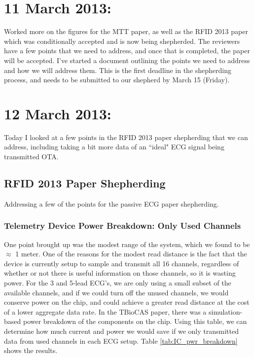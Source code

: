 \documentclass[12pt,onecolumn,titlepage]{article}
\begin{document}
\clearpage
\section{11 March 2013:}

\indent \indent Worked more on the figures for the MTT paper, as well as the RFID 2013 paper which was conditionally accepted and is now being shepherded. The reviewers have a few points that we need to address, and once that is completed, the paper will be accepted. I've started a document outlining the points we need to address and how we will address them. This is the first deadline in the shepherding process, and needs to be submitted to our shepherd by March 15 (Friday). 



\clearpage
\section{12 March 2013:}

\indent \indent Today I looked at a few points in the RFID 2013 paper shepherding that we can address, including taking a bit more data of an ``ideal" ECG signal being transmitted OTA.

\subsection{RFID 2013 Paper Shepherding}
\indent \indent Addressing a few of the points for the passive ECG paper shepherding.

\subsubsection{Telemetry Device Power Breakdown: Only Used Channels}
\indent \indent One point brought up was the modest range of the system, which we found to be $\approx$ 1 meter. One of the reasons for the modest read distance is the fact that the device is currently setup to sample and transmit all 16 channels, regardless of whether or not there is useful information on those channels, so it is wasting power. For the 3 and 5-lead ECG's, we are only using a small subset of the available channels, and if we could turn off the unused channels, we would conserve power on the chip, and could achieve a greater read distance at the cost of a lower aggregate data rate. In the TBioCAS paper, there was a simulation-based power breakdown of the components on the chip. Using this table, we can determine how much current and power we would save if we only transmitted data from used channels in each ECG setup. Table \ref{tab:IC_pwr_breakdown} shows the results.
\end{document}
